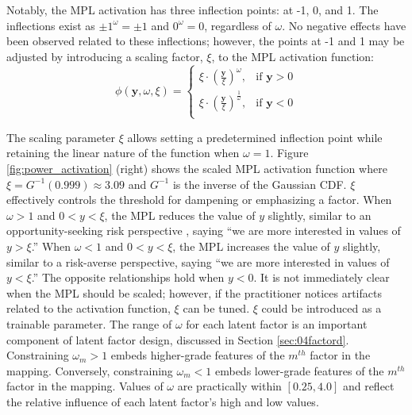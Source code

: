 Notably, the \gls{MPL} activation has three inflection points: at -1, 0, and 1. The inflections exist as $\pm 1^{\omega} = \pm 1$ and $0^{\omega} = 0$, regardless of $\omega$. No negative effects have been observed related to these inflections; however, the points at -1 and 1 may be adjusted by introducing a scaling factor, $\xi$, to the \gls{MPL} activation function:
\begin{equation}
    \phi \left( \mathbf{y}, \omega, \xi \right) =
    \begin{cases}
        \xi \cdot \left(\frac{\mathbf{y}}{\xi}\right)^{\omega},           & \text{if $\mathbf{y} > 0$} \\
        \xi \cdot \left(\frac{\mathbf{y}}{\xi}\right)^{\frac{1}{\omega}}, & \text{if $\mathbf{y} < 0$} \\
    \end{cases}
    \label{eq:power_scale}
\end{equation}

The scaling parameter $\xi$ allows setting a predetermined inflection point while retaining the linear nature of the function when $\omega = 1$. Figure \ref{fig:power_activation} (right) shows the scaled \gls{MPL} activation function where $\xi = G^{-1}(0.999) \approx 3.09$ and $G^{-1}$ is the inverse of the Gaussian \gls{CDF}. $\xi$ effectively controls the threshold for dampening or emphasizing a factor. When $\omega > 1$ and $0 < y < \xi$, the \gls{MPL} reduces the value of $y$ slightly, similar to an opportunity-seeking risk perspective \citep{eidsvik2015value}, saying ``we are more interested in values of $y > \xi$.'' When $\omega < 1$ and $0 < y < \xi$, the \gls{MPL} increases the value of $y$ slightly, similar to a risk-averse perspective, saying ``we are more interested in values of $y < \xi$.'' The opposite relationships hold when $y < 0$. It is not immediately clear when the \gls{MPL} should be scaled; however, if the practitioner notices artifacts related to the activation function, $\xi$ can be tuned. $\xi$ could be introduced as a trainable parameter. The range of $\omega$ for each latent factor is an important component of latent factor design, discussed in Section \ref{sec:04factord}. Constraining $\omega_{m} > 1$ embeds higher-grade features of the $m^{th}$ factor in the mapping. Conversely, constraining $\omega_{m} < 1$ embeds lower-grade features of the $m^{th}$ factor in the mapping. Values of $\omega$ are practically within $[0.25, 4.0]$ and reflect the relative influence of each latent factor's high and low values.

